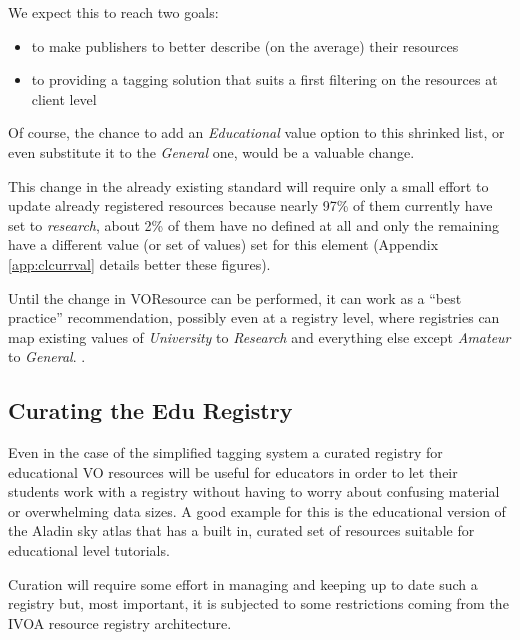\documentclass{ivoa}
\begin{document}
We expect this to reach two goals:
  
\begin{itemize}

\item to make publishers to better describe (on the average)
    their resources{}

\item to providing a tagging solution that suits a first filtering 
    on the resources at client level{}

\end{itemize}

Of course, the chance to 
add an 
\emph{Educational}
value option to this shrinked list, or even
substitute it to the 
\emph{General}
one, would be a valuable change.
  


This change in the already existing standard will require only 
a small effort to update already registered resources because nearly 97\% of 
them currently have  set to 
\emph{research}, about 2\% of them have
no  defined at all and only the remaining have a different value
(or set of values) set for this element (Appendix \ref{app:clcurrval} details better these
figures).
  

Until the change in VOResource can be performed, it
can work as a ``best practice'' recommendation, possibly even at a
registry level, where registries can map existing 
 values 
  of 
\emph{University}
 to 
\emph{Research}
 and
  everything else except 
\emph{Amateur}
 to 
\emph{General}.
.


\subsection{Curating the Edu Registry}

\label{sect:edureg}


Even in the case of the simplified 
tagging system
a curated registry for educational VO resources will be useful for
educators in order to let their students work with a registry without having to
worry about confusing material or overwhelming data sizes. A good example
for this is the educational version of the Aladin sky atlas that has a
built in, curated set of resources suitable for educational level 
tutorials.
  


Curation will require some effort in managing and keeping up to date
such a registry but, most important, it is subjected to  some restrictions coming from
the IVOA resource registry architecture. 
  
\end{document}
